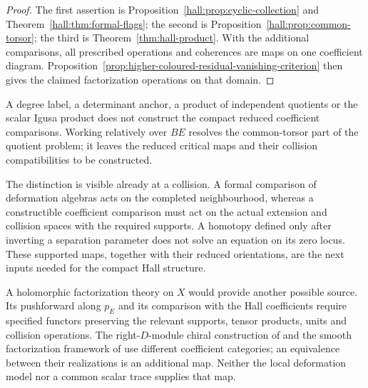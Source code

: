 \begin{proof}
The first assertion is
Proposition~\ref{hall:prop:cyclic-collection} and
Theorem~\ref{hall:thm:formal-flags}; the second is
Proposition~\ref{hall:prop:common-torsor}; the third is
Theorem~\ref{thm:hall-product}. With the additional comparisons,
all prescribed operations and coherences are maps on one
coefficient diagram. Proposition~\ref{prop:higher-coloured-residual-vanishing-criterion}
then gives the claimed factorization operations on that domain.
\end{proof}

\begin{corollary}
\label{cor:no-quotient-first-hybrid-repair}
A degree label, a determinant anchor, a product of independent
quotients or the scalar Igusa product does not construct the
compact reduced coefficient comparisons. Working relatively over
$BE$ resolves the common-torsor part of the quotient problem;
it leaves the reduced critical maps and their collision
compatibilities to be constructed.
\end{corollary}

The distinction is visible already at a collision. A formal
comparison of deformation algebras acts on the completed
neighbourhood, whereas a constructible coefficient comparison
must act on the actual extension and collision spaces with the
required supports. A homotopy defined only after inverting a
separation parameter does not solve an equation on its zero
locus. These supported maps, together with their reduced
orientations, are the next inputs needed for the compact Hall
structure.

A holomorphic factorization theory on $X$ would provide another
possible source. Its pushforward along $p_E$ and its comparison
with the Hall coefficients require specified functors preserving
the relevant supports, tensor products, units and collision
operations. The right-$D$-module chiral construction of
\cite{BD} and the smooth factorization framework of
\cite{CostelloGwilliam2} use different coefficient categories;
an equivalence between their realizations is an additional map.
Neither the local deformation model nor a common scalar trace
supplies that map.
